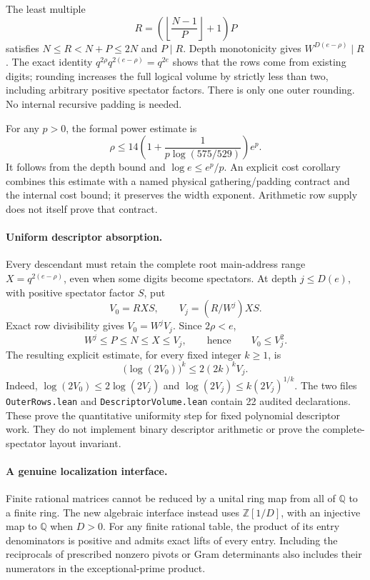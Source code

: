 \documentclass[11pt]{article}
\newcommand{\Q}{\mathbb Q}
\begin{document}
The least multiple
\[
 R=\left(\left\lfloor\frac{N-1}{P}\right\rfloor+1\right)P
\]
satisfies $N\le R<N+P\le2N$ and $P\mid R$.
Depth monotonicity gives $W^{D(e-\rho)}\mid R$.
The exact identity $q^{2\rho}q^{2(e-\rho)}=q^{2e}$ shows that the rows
come from existing digits; rounding increases the full logical volume by
strictly less than two, including arbitrary positive spectator factors.
There is only one outer rounding. No internal recursive padding is needed.

For any $p>0$, the formal power estimate is
\[
 \rho\le14\left(1+\frac{1}{p\log(575/529)}\right)e^p.
\]
It follows from the depth bound and $\log e\le e^p/p$.
An explicit cost corollary combines this estimate with a named physical
gathering/padding contract and the internal cost bound; it preserves the
width exponent. Arithmetic row supply does not itself prove that contract.

\paragraph{Uniform descriptor absorption.}
Every descendant must retain the complete root main-address range
$X=q^{2(e-\rho)}$, even when some digits become spectators. At depth
$j\le D(e)$, with positive spectator factor $S$, put
\[
 V_0=RXS,\qquad V_j=(R/W^j)XS.
\]
Exact row divisibility gives $V_0=W^jV_j$. Since $2\rho<e$,
\[
 W^j\le P\le N\le X\le V_j,
 \qquad\text{hence}\qquad V_0\le V_j^2.
\]
The resulting explicit estimate, for every fixed integer $k\ge1$, is
\[
 \bigl(\log(2V_0)\bigr)^k\le2(2k)^kV_j.
\]
Indeed, $\log(2V_0)\le2\log(2V_j)$ and
$\log(2V_j)\le k(2V_j)^{1/k}$.
The two files \texttt{OuterRows.lean} and \texttt{DescriptorVolume.lean}
contain 22 audited declarations. These prove the quantitative uniformity
step for fixed polynomial descriptor work. They do not implement binary
descriptor arithmetic or prove the complete-spectator layout invariant.

\paragraph{A genuine localization interface.}
Finite rational matrices cannot be reduced by a unital ring map from all
of $\Q$ to a finite ring. The new algebraic interface instead uses
$\mathbb Z[1/D]$, with an injective map to $\Q$ when $D>0$.
For any finite rational table, the product of its entry denominators is
positive and admits exact lifts of every entry. Including the reciprocals
of prescribed nonzero pivots or Gram determinants also includes their
numerators in the exceptional-prime product.
\end{document}
